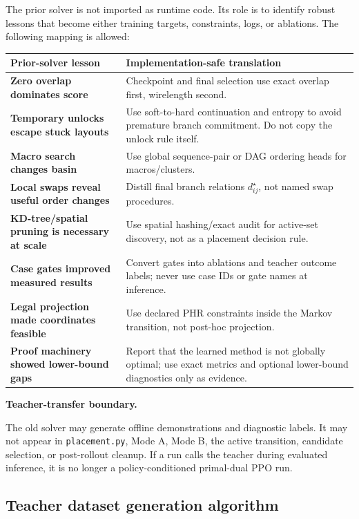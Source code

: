 \documentclass[11pt]{article}
\newcommand{\callout}[3]{%
\medskip\noindent\textbf{\textcolor{#1}{#2.}}\par\noindent #3\par\medskip
}
\begin{document}
The prior solver is not imported as runtime code. Its role is to identify robust lessons that become either training targets, constraints, logs, or ablations. The following mapping is allowed:

\begin{center}
\small
\begin{tabularx}{\textwidth}{>{\bfseries\color{navy}}p{}Y}
\toprule
Prior-solver lesson & Implementation-safe translation \\
\midrule
Zero overlap dominates score & Checkpoint and final selection use exact overlap first, wirelength second. \\
Temporary unlocks escape stuck layouts & Use soft-to-hard continuation and entropy to avoid premature branch commitment. Do not copy the unlock rule itself. \\
Macro search changes basin & Use global sequence-pair or DAG ordering heads for macros/clusters. \\
Local swaps reveal useful order changes & Distill final branch relations $d_{ij}^{\star}$, not named swap procedures. \\
KD-tree/spatial pruning is necessary at scale & Use spatial hashing/exact audit for active-set discovery, not as a placement decision rule. \\
Case gates improved measured results & Convert gates into ablations and teacher outcome labels; never use case IDs or gate names at inference. \\
Legal projection made coordinates feasible & Use declared PHR constraints inside the Markov transition, not post-hoc projection. \\
Proof machinery showed lower-bound gaps & Report that the learned method is not globally optimal; use exact metrics and optional lower-bound diagnostics only as evidence. \\
\bottomrule
\end{tabularx}
\end{center}

\callout{orange!80!black}{Teacher-transfer boundary}{The old solver may generate offline demonstrations and diagnostic labels. It may not appear in \texttt{placement.py}, Mode A, Mode B, the active transition, candidate selection, or post-rollout cleanup. If a run calls the teacher during evaluated inference, it is no longer a policy-conditioned primal-dual PPO run.}

\subsection{Teacher dataset generation algorithm}
\end{document}
